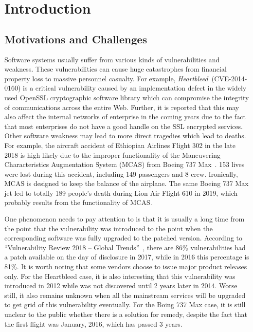 
\chapter{Introduction} \label{ch:introduction}


\section{Motivations and Challenges}
Software systems usually suffer from various kinds of vulnerabilities and weakness. These vulnerabilities can cause huge catastrophes from financial property loss to massive personnel casualty. For example, \emph{Heartbleed}~\cite{heartbleed}(CVE-2014-0160) is a critical vulnerability caused by an implementation defect in the widely used OpenSSL cryptographic software library which can compromise the integrity of communications across the entire Web. Further, it is reported that this may also affect the internal networks of enterprise in the coming years due to the fact that most enterprises do not have a good handle on the SSL encrypted services. Other software weakness may lead to more direct tragedies which lead to deaths. For example, the aircraft accident of Ethiopian Airlines Flight 302 in the late 2018 is high likely due to the improper functionality of the Maneuvering Characteristics Augmentation System (MCAS) from Boeing 737 Max~\cite{boeing_Ethiopian}. 153 lives were lost during this accident, including 149 passengers and 8 crew. Ironically, MCAS is designed to keep the balance of the airplane. The same Boeing 737 Max jet led to totally 189 people's death during Lion Air Flight 610 in 2019, which probably results from the functionality of MCAS.

One phenomenon needs to pay attention to is that it is usually a long time from the point that the vulnerability was introduced to the point when the corresponding software was fully upgraded to the patched version. According to ``Vulnerability Review 2018 -- Global Trends''~\cite{vul_flexera18}, there are 86\% vulnerabilities had a patch available on the day of disclosure in 2017, while in 2016 this percentage is 81\%. It is worth noting that some vendors choose to issue major product releases only. For the Heartbleed case, it is also interesting that this vulnerability was introduced in 2012 while was not discovered until 2 years later in 2014. Worse still, it also remains unknown when all the mainstream services will be upgraded to get grid of this vulnerability eventually. For the Boing 737 Max case, it is still unclear to the public whether there is a solution for remedy, despite the fact that the first flight was January, 2016, which has passed 3 years.

